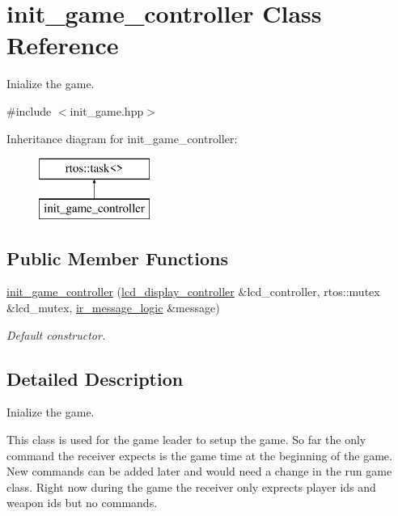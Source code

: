 \hypertarget{classinit__game__controller}{}\section{init\+\_\+game\+\_\+controller Class Reference}
\label{classinit__game__controller}


Inialize the game.  




{\ttfamily \#include $<$init\+\_\+game.\+hpp$>$}

Inheritance diagram for init\+\_\+game\+\_\+controller\+:\begin{figure}[H]
\begin{center}
\leavevmode
\includegraphics[height=2.000000cm]{classinit__game__controller}
\end{center}
\end{figure}
\subsection*{Public Member Functions}
\begin{DoxyCompactItemize}
\item 
\hyperlink{classinit__game__controller_a8b506bc4f98428bbceca83027a41f184}{init\+\_\+game\+\_\+controller} (\hyperlink{classlcd__display__controller}{lcd\+\_\+display\+\_\+controller} \&lcd\+\_\+controller, rtos\+::mutex \&lcd\+\_\+mutex, \hyperlink{classir__message__logic}{ir\+\_\+message\+\_\+logic} \&message)
\begin{DoxyCompactList}\small\item\em Default constructor. \end{DoxyCompactList}\end{DoxyCompactItemize}


\subsection{Detailed Description}
Inialize the game. 

This class is used for the game leader to setup the game. So far the only command the receiver expects is the game time at the beginning of the game. New commands can be added later and would need a change in the run game class. Right now during the game the receiver only exprects player ids and weapon ids but no commands. 

